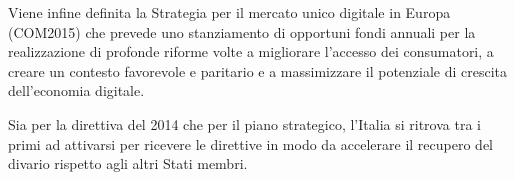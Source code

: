 Viene infine definita la Strategia per il mercato unico digitale in Europa (COM2015) che prevede uno stanziamento di opportuni fondi annuali per la realizzazione di profonde riforme volte a migliorare l’accesso dei consumatori, a creare un contesto favorevole e paritario e a massimizzare il potenziale di crescita
dell’economia digitale.\bigskip 

Sia per la direttiva del 2014 che per il piano strategico, l’Italia si ritrova tra i primi ad attivarsi per ricevere le direttive in modo da accelerare il recupero del divario rispetto agli altri Stati membri.
